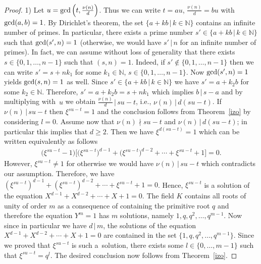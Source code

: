 \documentclass[10pt,a4paper]{amsart}
\numberwithin{equation}{section}
\begin{document}
\begin{proof} 1) Let $u = {\rm gcd}\left(t, \frac{\nu(n)}{d}\right)$. Thus we can write $t = au$, $ \frac{\nu(n)}{d} = bu$ with ${\rm gcd}(a, b) = 1$. By Dirichlet's theorem, the set $\{a+kb \,|\, k \in \mathbb{N}\}$ contains an infinite number of primes. In particular, there exists a prime number $s' \in \{a+kb \,|\, k \in \mathbb{N}\}$ such that ${\rm gcd}(s', n) = 1$ (otherwise, we would have $s' \,|\, n$ for an infinite number of primes). In fact, we can assume without loss of generality that there exists $s \in \{0, 1,\dots, n-1\}$ such that $(s, n) = 1$. Indeed, if $s' \notin \{0, 1,\dots, n-1\}$ then we can write $s' = s + nk_{1}$ for some $k_{1} \in \mathbb{N}$, $s \in \{0, 1,\dots, n-1\}$. Now ${\rm gcd}(s', n) = 1$ yields ${\rm gcd}(s, n) = 1$ as well. Since $s' \in \{a+kb \,|\, k \in \mathbb{N}\}$ we have $s' = a + k_{2}b$ for some $k_{2} \in \mathbb{N}$. Therefore, $s' = a + k_{2}b = s + nk_{1}$ which implies $b \,|\, s-a$ and by multiplying with~$u$ we obtain $ \frac{\nu(n)}{d} \,|\, su-t$, i.e., $\nu(n) \,|\, d(su-t)$. If $\nu(n) \,|\, su-t$ then $\xi^{su-t}=1$ and the conclusion follows from Theorem~\ref{izo} by considering $l=0$. Assume now that $\nu(n) \nmid su-t$ and $\nu(n) \,|\, d(su-t)$; in particular this implies that $d \geq 2$. Then we have $\xi^{d(su-t)} = 1$ which can be written equivalently as follows
\begin{gather*}
\big(\xi^{su-t} - 1\big)\big[\big(\xi^{su-t}\big)^{d-1} + \big(\xi^{su-t}\big)^{d-2} + \cdots + \xi^{su-t} +1\big] =0.
\end{gather*}
However, $\xi ^{su-t} \neq 1$ for otherwise we would have $\nu(n) \,|\, su-t$ which contradicts our assumption. Therefore, we have $(\xi^{su-t})^{d-1} + (\xi^{su-t})^{d-2} + \cdots + \xi^{su-t} +1 = 0$. Hence, $\xi^{su-t}$ is a solution of the equation $X^{d-1} + X^{d-2} + \cdots + X + 1 = 0$. The field $K$ contains all roots of unity of order $m$ as a consequence of containing the primitive root $q$ and therefore the equation $Y^{m} = 1$ has $m$ solutions, namely $1, q, q^{2},\dots, q^{m-1}$. Now since in particular we have $d \,|\, m$, the solutions of the equation $X^{d-1} + X^{d-2} + \cdots + X + 1 = 0$ are contained in the set $\{1, q, q^{2}, \dots, q^{m-1}\}$. Since we proved that $\xi^{su-t}$ is such a~solution, there exists some $l \in \{ 0,\dots, m-1 \}$ such that $\xi^{su-t} = q^{l}$. The desired conclusion now follows from Theorem~\ref{izo}.


\end{proof}
\end{document}
